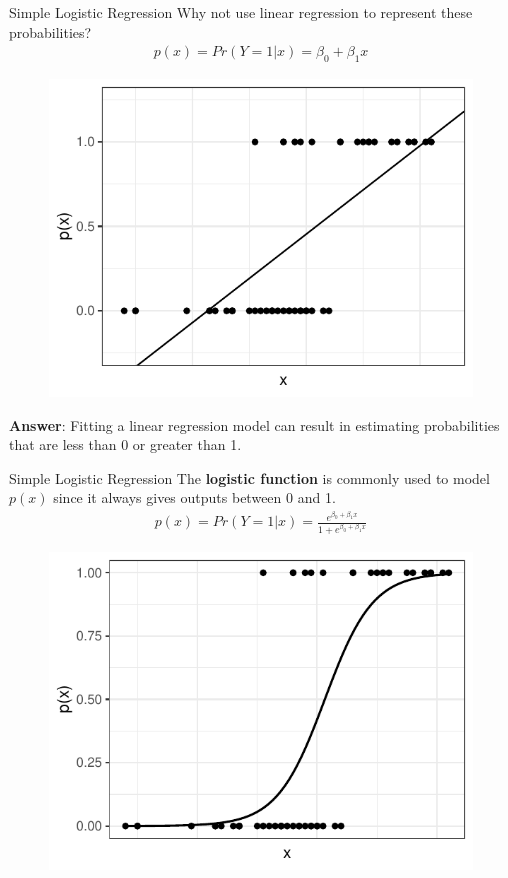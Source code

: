 \documentclass[10pt]{beamer}\usepackage[]{graphicx}\usepackage[]{color}
\begin{document}
\begin{frame}{Simple Logistic Regression}
Why not use linear regression to represent these probabilities?
\begin{align*}
p(x) = Pr(Y=1 | x) = \beta_0 + \beta_1 x
\end{align*}
\begin{figure}
\includegraphics[scale=0.6]{figure/linreg.pdf}
\end{figure}
\textbf{Answer}:  Fitting a linear regression model can result in estimating probabilities that are less than 0 or greater than 1.
\end{frame}

\begin{frame}{Simple Logistic Regression}
The \textbf{logistic function} is commonly used to model $p(x)$ since it always gives outputs between 0 and 1.
\begin{align*}
p(x) = Pr(Y=1 | x) = \frac{e^{\beta_0 + \beta_1 x}}{1 + e^{\beta_0 + \beta_1 x}}
\end{align*}
\begin{figure}
\includegraphics[scale=0.6]{figure/logistic.pdf}
\end{figure}
\end{frame}
\end{document}
